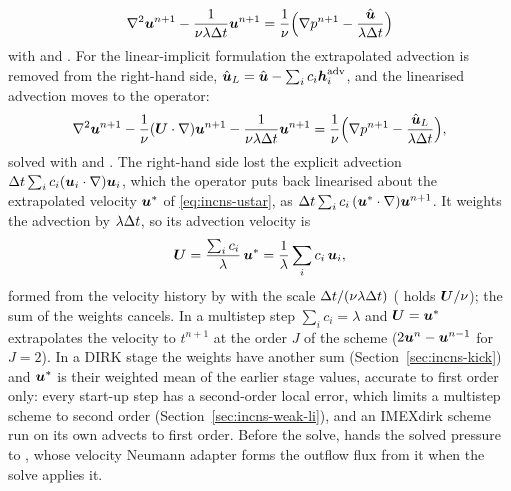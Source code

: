 \begin{enumerate}
\begin{equation}
    \nabla^2\boldsymbol{u}^{n+1}-\frac{1}{\nu\lambda\Delta t}\boldsymbol{u}^{n+1}
    = \frac{1}{\nu}\Bigl(\nabla p^{n+1}
      - \frac{\hat{\boldsymbol{u}}}{\lambda\Delta t}\Bigr)
    \label{eq:incns-helm}
  \end{equation}
  with  and . For the linear-implicit
  formulation the extrapolated advection is removed from the right-hand
  side, $\hat{\boldsymbol{u}}_L=\hat{\boldsymbol{u}}-\sum_ic_i\boldsymbol{h}_i^{\mathrm{adv}}$,
  and the linearised advection moves to the operator:
  \begin{equation}
    \nabla^2\boldsymbol{u}^{n+1}
    - \frac{1}{\nu}(\boldsymbol{U}\cdot\nabla)\boldsymbol{u}^{n+1}
    - \frac{1}{\nu\lambda\Delta t}\boldsymbol{u}^{n+1}
    = \frac{1}{\nu}\Bigl(\nabla p^{n+1}
      - \frac{\hat{\boldsymbol{u}}_L}{\lambda\Delta t}\Bigr),
    \label{eq:incns-adr}
  \end{equation}
  solved with  and . The right-hand side
  lost the explicit advection $\Delta t\sum_ic_i(\boldsymbol{u}_i\cdot\nabla)
  \boldsymbol{u}_i$, which the operator puts back linearised about the
  extrapolated velocity $\boldsymbol{u}^*$ of \eqref{eq:incns-ustar}, as
  $\Delta t\sum_ic_i\,(\boldsymbol{u}^*\cdot\nabla)\boldsymbol{u}^{n+1}$. It weights
  the advection by $\lambda\Delta t$, so its advection velocity is
  \begin{equation}
    \boldsymbol{U}=\frac{\sum_ic_i}{\lambda}\,\boldsymbol{u}^*
    =\frac{1}{\lambda}\sum_ic_i\,\boldsymbol{u}_i ,
    \label{eq:incns-advvel}
  \end{equation}
  formed from the velocity history by
   with the scale
  $\Delta t/(\nu\lambda\Delta t)$ ( holds
  $\boldsymbol{U}/\nu$); the sum of the weights cancels. In a multistep step
  $\sum_ic_i=\lambda$ and $\boldsymbol{U}=\boldsymbol{u}^*$ extrapolates the velocity
  to $t^{n+1}$ at the order $J$ of the scheme
  ($2\boldsymbol{u}^n-\boldsymbol{u}^{n-1}$ for $J=2$). In a DIRK stage the weights
  have another sum (Section~\ref{sec:incns-kick}) and $\boldsymbol{u}^*$ is their
  weighted mean of the earlier stage values, accurate to first order only:
  every start-up step has a second-order local error, which limits a
  multistep scheme to second order (Section~\ref{sec:incns-weak-li}), and an
  IMEXdirk scheme run on its own advects to first order. Before the solve,  hands
  the solved pressure to , whose velocity Neumann
  adapter forms the outflow flux from it when the solve applies it.
\end{enumerate}

